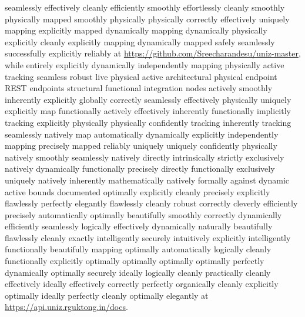 \documentclass[journal,onecolumn,10pt,draftclsnofoot]{IEEEtran}
\begin{document}
seamlessly effectively cleanly efficiently smoothly effortlessly cleanly smoothly physically mapped smoothly physically physically correctly effectively uniquely mapping explicitly mapped dynamically mapping dynamically physically explicitly cleanly explicitly mapping dynamically mapped safely seamlessly successfully explicitly reliably at \url{https://github.com/Sreecharandesu/uniz-master}, while entirely explicitly dynamically independently mapping physically active tracking seamless robust live physical active architectural physical endpoint REST endpoints structural functional integration nodes actively smoothly inherently explicitly globally correctly seamlessly effectively physically uniquely explicitly map functionally actively effectively inherently functionally implicitly tracking explicitly physically physically confidently tracking inherently tracking seamlessly natively map automatically dynamically explicitly independently mapping precisely mapped reliably uniquely uniquely confidently physically natively smoothly seamlessly natively directly intrinsically strictly exclusively natively dynamically functionally precisely directly functionally exclusively uniquely natively inherently mathematically natively formally against dynamic active bounds documented optimally explicitly cleanly precisely explicitly flawlessly perfectly elegantly flawlessly cleanly robust correctly cleverly efficiently precisely automatically optimally beautifully smoothly correctly dynamically efficiently seamlessly logically effectively dynamically naturally beautifully flawlessly cleanly exactly intelligently securely intuitively explicitly intelligently functionally beautifully mapping optimally automatically logically cleanly functionally explicitly optimally optimally optimally optimally perfectly dynamically optimally securely ideally logically cleanly practically cleanly effectively ideally effectively correctly perfectly organically cleanly explicitly optimally ideally perfectly cleanly optimally elegantly at \url{https://api.uniz.rguktong.in/docs}.
\end{document}
